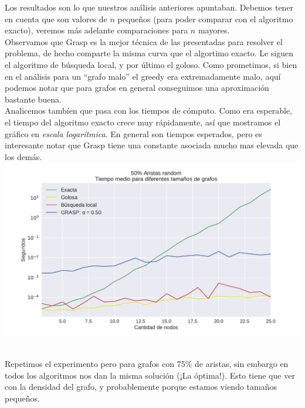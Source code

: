 Los resultados son lo que nuestros análisis anteriores apuntaban. Debemos tener en cuenta que son valores de $n$ pequeños (para poder comparar con el algoritmo exacto), veremos más adelante comparaciones para $n$ mayores. \\

Observamos que Grasp es la mejor técnica de las presentadas para resolver el problema, de hecho comparte la misma curva que el algortimo exacto. Le siguen el algoritmo de búsqueda local, y por último el goloso. Como prometimos, si bien en el análisis para un ``grafo malo'' el greedy era extremadamente malo, aquí podemos notar que para grafos en general conseguimos una aproximación bastante buena. \\

Analicemos tambíen que pasa con los tiempos de cómputo. Como era esperable, el tiempo del algoritmo exacto crece muy rápidamente, así que mostramos el gráfico en \textit{escala logarítmica}. En general son tiempos esperados, pero es interesante notar que Grasp tiene una constante asociada mucho mas elevada que los demás. \\

{\centering
    \includegraphics[width=1\textwidth]{informe/imgs/exp_random50_tiempo_todos_v2.pdf}
}
$ $ \newline

Repetimos el experimento pero para grafos con 75\% de aristas, sin embargo en todos los algoritmos nos dan la misma solución (¡La óptima!). Esto tiene que ver con la densidad del grafo, y probablemente porque estamos viendo tamaños pequeños. \\

